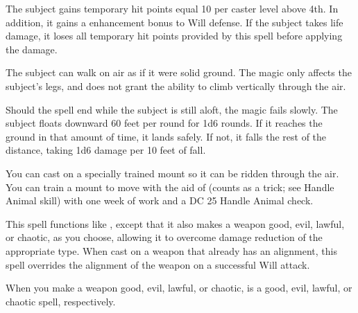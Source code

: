 \spellrng{\rngclose}
\spelldur{\durshort}
\begin{spelleffect}
  The subject gains temporary hit points equal 10  per caster level above 4th. In addition, it gains a  enhancement bonus to Will defense. \bonusscalingdescription  If the subject takes life damage, it loses all temporary hit points provided by this spell before applying the damage.
\end{spelleffect}

\spellrng{\rngtouch}
\spelldur{\durshort}
\begin{spelleffect}
  The subject can walk on air as if it were solid ground. The magic only affects the subject's legs, and does not grant the ability to climb vertically through the air.
  \par Should the spell end while the subject is still aloft, the magic fails slowly. The subject floats downward 60 feet per round for 1d6 rounds. If it reaches the ground in that amount of time, it lands safely. If not, it falls the rest of the distance, taking 1d6 damage per 10 feet of fall.
\end{spelleffect}
\begin{spellnotes}
  \par You can cast  on a specially trained mount so it can be ridden through the air. You can train a mount to move with the aid of  (counts as a trick; see Handle Animal skill) with one week of work and a DC 25 Handle Animal check.
\end{spellnotes}

\begin{spelleffect}
  This spell functions like , except that it also makes a weapon good, evil, lawful, or chaotic, as you choose, allowing it to overcome damage reduction of the appropriate type. When cast on a weapon that already has an alignment, this spell overrides the alignment of the weapon on a successful Will attack.
\end{spelleffect}
\begin{spellnotes}
  When you make a weapon good, evil, lawful, or chaotic,  is a good, evil, lawful, or chaotic spell, respectively.
\end{spellnotes}

